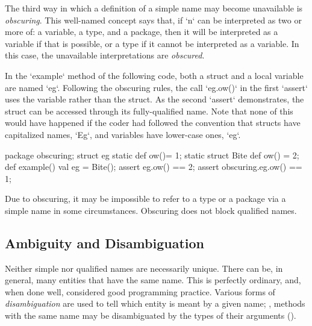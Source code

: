 The third way in which a definition of a simple name may become unavailable is
{\em obscuring}. This well-named concept says that, if \xcd`n` can be
interpreted as two or more of: a variable, a type, and a package, then it will
be interpreted as a variable if that is possible, or a type if it cannot be
interpreted as a variable. In this case, the unavailable interpretations are
{\em obscured}. 

\begin{ex}
In the \xcd`example` method of the following code, both a struct and a local
variable are named \xcd`eg`.  Following the obscuring rules, the call
\xcd`eg.ow()` in the first \xcd`assert` uses the variable rather than the struct.  
As the second \xcd`assert` demonstrates, the struct can be accessed through
its fully-qualified name.   Note that none of this would have happened if the
coder had followed the convention that structs have capitalized names,
\xcd`Eg`, and variables have lower-case ones, \xcd`eg`. 

% 
\begin{xten}
package obscuring;
struct eg {
   static def ow()= 1;
   static struct Bite {
      def ow() = 2;
   }
   def example() {
       val eg = Bite();
       assert eg.ow() == 2;
       assert obscuring.eg.ow() == 1;
     }
}

\end{xten}

\end{ex}

Due to obscuring, it may be impossible to refer to a type or a package via a
simple name in some circumstances.  Obscuring does not block qualified names.



\subsection{Ambiguity and Disambiguation}

Neither simple nor qualified names are necessarily unique.  There can be, in
general, many entities that have the same name.  This is perfectly ordinary,
and, when done well, considered good programming practice.   Various forms of
{\em disambiguation} are used to tell which entity is meant by a given name;
\eg, methods with the same name may be disambiguated by the types of their
arguments ().

